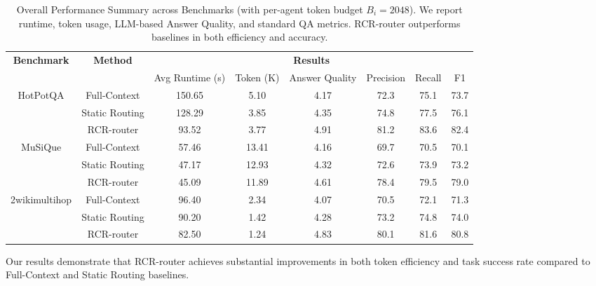 \documentclass[letterpaper]{article} %
\begin{document}
\begin{table}[t]
\centering
\caption{Overall Performance Summary across Benchmarks (with per-agent token budget $B_i = 2048$). We report runtime, token usage, LLM-based Answer Quality, and standard QA metrics. RCR-router outperforms baselines in both efficiency and accuracy.}

\label{tab:main_results}
\begin{tabular}{c|c|c|c|c|c|c|c}
\toprule
\multirow{2}{*}{\textbf{Benchmark}} & \multirow{2}{*}{\textbf{Method}} & \multicolumn{6}{c}{\textbf{Results}} \\
\cline{3-8}
& & Avg Runtime (s) & Token (K) & Answer Quality & Precision & Recall & F1 \\
\midrule
\multirow{3}{*}{HotPotQA} 
& Full-Context    & 150.65 & 5.10 & 4.17 & 72.3 & 75.1 & 73.7 \\
& Static Routing  & 128.29 & 3.85 & 4.35 & 74.8 & 77.5 & 76.1 \\
& RCR-router      & 93.52  & 3.77 & 4.91 & 81.2 & 83.6 & 82.4 \\
\midrule
\multirow{3}{*}{MuSiQue} 
& Full-Context    & 57.46  & 13.41 & 4.16 & 69.7 & 70.5 & 70.1 \\
& Static Routing  & 47.17  & 12.93 & 4.32 & 72.6 & 73.9 & 73.2 \\
& RCR-router      & 45.09  & 11.89 & 4.61 & 78.4 & 79.5 & 79.0 \\
\midrule
\multirow{3}{*}{2wikimultihop} 
& Full-Context    & 96.40  & 2.34  & 4.07 & 70.5 & 72.1 & 71.3 \\
& Static Routing  & 90.20  & 1.42  & 4.28 & 73.2 & 74.8 & 74.0 \\
& RCR-router      & 82.50  & 1.24  & 4.83 & 80.1 & 81.6 & 80.8 \\
\bottomrule
\end{tabular}
\vspace{-3mm}
\end{table}


Our results demonstrate that RCR-router achieves substantial improvements in both token efficiency and task success rate compared to Full-Context and Static Routing baselines.

\end{document}
